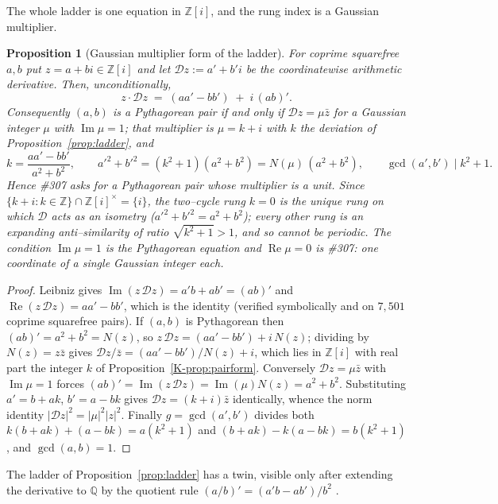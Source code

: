 \documentclass[11pt]{article}
\newtheorem{proposition}[theorem]{Proposition}
\theoremstyle{definition}
\begin{document}
The whole ladder is one equation in $\mathbb{Z}[i]$, and the rung index is a Gaussian multiplier.

\begin{proposition}[Gaussian multiplier form of the ladder]\label{prop:multiplier}
For coprime squarefree $a,b$ put $z=a+bi\in\mathbb{Z}[i]$ and let $\mathcal{D}z:=a'+b'i$ be the
coordinatewise arithmetic derivative. Then, unconditionally,
\[ z\cdot\mathcal{D}z\;=\;(aa'-bb')\;+\;i\,(ab)'. \]
Consequently $(a,b)$ is a Pythagorean pair if and only if $\mathcal{D}z=\mu\bar z$ for a Gaussian
integer $\mu$ with $\operatorname{Im}\mu=1$; that multiplier is $\mu=k+i$ with $k$ the deviation of
Proposition~\ref{prop:ladder}, and
\[ k=\frac{aa'-bb'}{a^2+b^2},\qquad
   a'^2+b'^2=(k^2+1)(a^2+b^2)=N(\mu)\,(a^2+b^2),\qquad \gcd(a',b')\mid k^2+1. \]
Hence \#307 asks for a Pythagorean pair whose multiplier is a \emph{unit}. Since
$\{k+i:k\in\mathbb{Z}\}\cap\mathbb{Z}[i]^{\times}=\{i\}$, the two--cycle rung $k=0$ is the unique rung
on which $\mathcal{D}$ acts as an isometry ($a'^2+b'^2=a^2+b^2$); every other rung is an expanding
anti--similarity of ratio $\sqrt{k^2+1}>1$, and so cannot be periodic. The condition
$\operatorname{Im}\mu=1$ is the Pythagorean equation and $\operatorname{Re}\mu=0$ is \#307: one
coordinate of a single Gaussian integer each.
\end{proposition}
\begin{proof}
Leibniz gives $\operatorname{Im}(z\,\mathcal{D}z)=a'b+ab'=(ab)'$ and
$\operatorname{Re}(z\,\mathcal{D}z)=aa'-bb'$, which is the identity (verified symbolically and on
$7{,}501$ coprime squarefree pairs). If $(a,b)$ is Pythagorean then $(ab)'=a^2+b^2=N(z)$, so
$z\,\mathcal{D}z=(aa'-bb')+i\,N(z)$; dividing by $N(z)=z\bar z$ gives
$\mathcal{D}z/\bar z=(aa'-bb')/N(z)+i$, which lies in $\mathbb{Z}[i]$ with real part the integer $k$ of
Proposition~\ref{K-prop:pairform}. Conversely $\mathcal{D}z=\mu\bar z$ with $\operatorname{Im}\mu=1$
forces $(ab)'=\operatorname{Im}(z\,\mathcal{D}z)=\operatorname{Im}(\mu)N(z)=a^2+b^2$. Substituting
$a'=b+ak$, $b'=a-bk$ gives $\mathcal{D}z=(k+i)\bar z$ identically, whence the norm identity
$|\mathcal{D}z|^2=|\mu|^2|z|^2$. Finally $g=\gcd(a',b')$ divides both
$k(b+ak)+(a-bk)=a(k^2+1)$ and $(b+ak)-k(a-bk)=b(k^2+1)$, and $\gcd(a,b)=1$.
\end{proof}

The ladder of Proposition~\ref{prop:ladder} has a twin, visible only after extending the derivative
to $\mathbb{Q}$ by the quotient rule $(a/b)'=(a'b-ab')/b^2$ \cite{UfnarovskiAhlander2003}.
\end{document}
